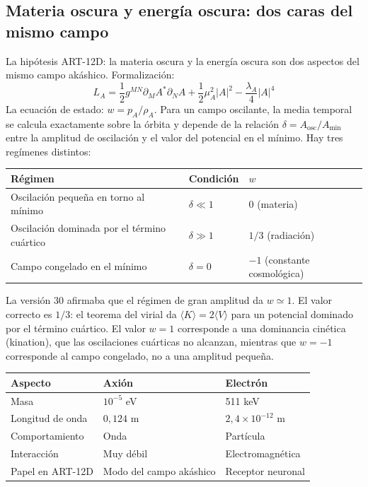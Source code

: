 \documentclass[11pt,a4paper]{article}
\begin{document}
\subsection{Materia oscura y energía oscura: dos caras del mismo campo}
La hipótesis ART-12D: la materia oscura y la energía oscura son dos aspectos del mismo campo akáshico. Formalización:
\begin{equation}
L_A = \frac{1}{2} g^{MN} \partial_M A^* \partial_N A + \frac{1}{2} \mu_A^2 |A|^2 - \frac{\lambda_A}{4} |A|^4
\end{equation}
La ecuación de estado: $w = p_A / \rho_A$. Para un campo oscilante, la media temporal se calcula exactamente sobre la órbita y depende de la relación $\delta = A_{\text{osc}}/A_{\min}$ entre la amplitud de oscilación y el valor del potencial en el mínimo. Hay tres regímenes distintos:
\begin{center}
\begin{tabular}{@{}lll@{}}
\toprule
\textbf{Régimen} & \textbf{Condición} & $w$ \\ \midrule
Oscilación pequeña en torno al mínimo & $\delta \ll 1$ & $0$ (materia) \\
Oscilación dominada por el término cuártico & $\delta \gg 1$ & $1/3$ (radiación) \\
Campo congelado en el mínimo & $\delta = 0$ & $-1$ (constante cosmológica) \\ \bottomrule
\end{tabular}
\end{center}
La versión 30 afirmaba que el régimen de gran amplitud da $w \simeq 1$. El valor correcto es $1/3$: el teorema del virial da $\langle K \rangle = 2\langle V \rangle$ para un potencial dominado por el término cuártico. El valor $w = 1$ corresponde a una dominancia cinética (kination), que las oscilaciones cuárticas no alcanzan, mientras que $w = -1$ corresponde al campo congelado, no a una amplitud pequeña.
\begin{table}[H]
\centering
\begin{tabular}{@{}lll@{}}
\toprule
\textbf{Aspecto} & \textbf{Axión} & \textbf{Electrón} \\ \midrule
Masa & \(10^{-5}\) eV & 511 keV \\
Longitud de onda & \(0,124\) m & \(2,4\times10^{-12}\) m \\
Comportamiento & Onda & Partícula \\
Interacción & Muy débil & Electromagnética \\
Papel en ART-12D & Modo del campo akáshico & Receptor neuronal \\ \bottomrule
\end{tabular}
\end{table}
\end{document}
